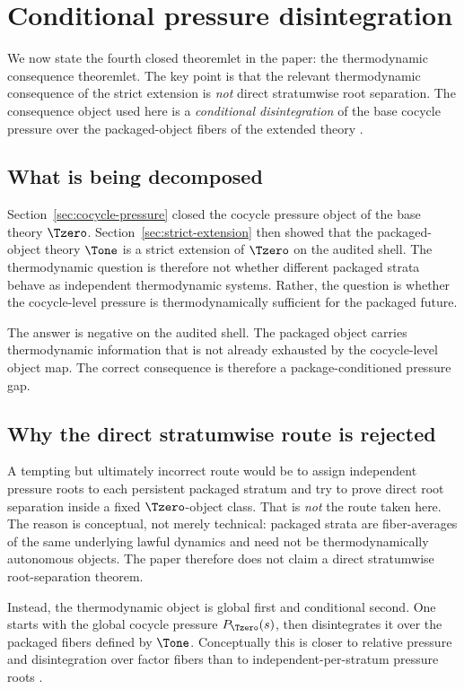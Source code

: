 \section{Conditional pressure disintegration}\label{sec:conditional-disintegration}

We now state the fourth closed theoremlet in the paper: the thermodynamic consequence theoremlet. The key point is that the relevant thermodynamic consequence of the strict extension is \emph{not} direct stratumwise root separation. The consequence object used here is a \emph{conditional disintegration} of the base cocycle pressure over the packaged-object fibers of the extended theory \cite{Rokhlin1949FundamentalIdeas}.

\subsection{What is being decomposed}

Section~\ref{sec:cocycle-pressure} closed the cocycle pressure object of the base theory \(\Tzero\). Section~\ref{sec:strict-extension} then showed that the packaged-object theory \(\Tone\) is a strict extension of \(\Tzero\) on the audited shell. The thermodynamic question is therefore not whether different packaged strata behave as independent thermodynamic systems. Rather, the question is whether the cocycle-level pressure is thermodynamically sufficient for the packaged future.

The answer is negative on the audited shell. The packaged object carries thermodynamic information that is not already exhausted by the cocycle-level object map. The correct consequence is therefore a package-conditioned pressure gap.

\subsection{Why the direct stratumwise route is rejected}

A tempting but ultimately incorrect route would be to assign independent pressure roots to each persistent packaged stratum and try to prove direct root separation inside a fixed \(\Tzero\)-object class. That is \emph{not} the route taken here. The reason is conceptual, not merely technical: packaged strata are fiber-averages of the same underlying lawful dynamics and need not be thermodynamically autonomous objects. The paper therefore does not claim a direct stratumwise root-separation theorem.

Instead, the thermodynamic object is global first and conditional second. One starts with the global cocycle pressure \(P_{\Tzero}(s)\), then disintegrates it over the packaged fibers defined by \(\Tone\). Conceptually this is closer to relative pressure and disintegration over factor fibers than to independent-per-stratum pressure roots \cite{LedrappierWalters1977RelativisedVP,Walters1986RelativePressure}.

